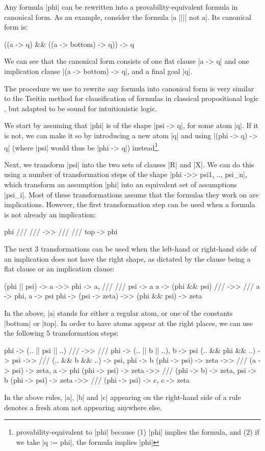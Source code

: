 \documentclass{llncs}
\begin{document}
Any formula |phi| can be rewritten into a provability-equivalent formula in canonical form. As an example, consider the formula
|a |||| not a|. Its canonical form is:
\begin{code}
((a -> q) && ((a -> bottom) -> q)) -> q
\end{code}
We can see that the canonical form consists of one flat clause |a -> q| and one implication clause |(a -> bottom) -> q|, and a final goal |q|.

The procedure we use to rewrite any formula into canonical form is very similar to the Tseitin method for clausification of formulas in classical propositional logic \cite{tseitin}, but adapted to be sound for intuitionistic logic.

We start by assuming that |phi| is of the shape |psi -> q|, for some atom |q|. If it is not, we can make it so by introducing a new atom |q| and using |(phi -> q) -> q| (where |psi| would thus be |phi -> q|) instead\footnote{provability-equivalent to |phi| because (1) |phi| implies the formula, and (2) if we take |q := phi|, the formula implies |phi|}.

Next, we transform |psi| into the two sets of clauses |R| and |X|. We can
do this using a number of transformation steps of the shape |phi ->> psi1, .., psi_n|, which transform an assumption |phi|
into an equivalent set of assumptions |psi_i|. Most of these transformations assume that the formulas they work on are implications. However, the first transformation step can be used
when a formula is not already an implication:
\begin{code}
                   phi /// /// ->> /// /// top -> phi
\end{code}
The next 3 transformations can be used when the left-hand or right-hand side of
an implication does not have the right shape, as dictated by the clause being a flat clause or an implication clause:
\begin{code}
(phi ||  psi)  ->  a                   ->>      phi -> a, /// ///  psi -> a
         a     ->  (phi && psi)   ///  ->> ///  a -> phi,          a -> psi
         phi   ->  (psi -> zeta)       ->>      (phi && psi) -> zeta
\end{code}
In the above, |a| stands for either a regular atom, or one of
the constants |bottom| or |top|. In order to have atoms appear at the right places, we can use the following 5 transformation steps:
\begin{code}
                  phi   ->  (.. || psi || ..)  ///  ->> /// phi  -> (.. || b || ..),   b -> psi
(.. &&  phi   &&  ..)   ->  psi                     ->> /// (.. &&  b &&  ..) -> psi,  phi -> b
        (phi  ->  psi)  ->  zeta                    ->> /// (a    ->  psi)  -> zeta,   a -> phi
        (phi  ->  psi)  ->  zeta                    ->> /// (phi  ->  b)    -> zeta,   psi -> b
        (phi  ->  psi)  ->  zeta                    ->> /// (phi  ->  psi)  -> c,      c -> zeta
\end{code}
In the above rules, |a|, |b| and |c| appearing on the right-hand side of a rule denotes a fresh atom not appearing anywhere else.
\end{document}
